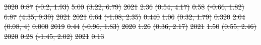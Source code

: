 \documentclass[
  letterpaper,
  DIV=11,
  numbers=noendperiod]{scrartcl}
\providecommand{\DIFdel}[1]{{\protect\color{red}\sout{#1}}}                      %
\providecommand{\DIFdelFL}[1]{\DIFdel{#1}} %
\begin{document}
\DIFdelFL{2020 }%
\DIFdelFL{0.87 }%
\DIFdelFL{(-0.2, 1.93) }%
\DIFdelFL{5.00 }%
\DIFdelFL{(3.22, 6.79) }%
\DIFdelFL{2021 }%
\DIFdelFL{2.36 }%
\DIFdelFL{(0.54, 4.17) }%
\DIFdelFL{0.58 }%
\DIFdelFL{(-0.66, 1.82) }%
\DIFdelFL{6.87 }%
\DIFdelFL{(4.35, 9.39) }%
\DIFdelFL{\hspace{1em}2021 }%
\DIFdelFL{2021 }%
\DIFdelFL{0.64 }%
\DIFdelFL{(-1.08, 2.35) }%
\DIFdelFL{0.440 }%
\DIFdelFL{1.06 }%
\DIFdelFL{(0.32, 1.79) }%
\DIFdelFL{0.320 }%
\DIFdelFL{2.04 }%
\DIFdelFL{(0.08, 4) }%
\DIFdelFL{0.000}%
\DIFdelFL{2019 }%
\DIFdelFL{0.44 }%
\DIFdelFL{(-0.96, 1.83) }%
\DIFdelFL{2020 }%
\DIFdelFL{1.26 }%
\DIFdelFL{(0.36, 2.17) }%
\DIFdelFL{2021 }%
\DIFdelFL{1.50 }%
\DIFdelFL{(0.55, 2.46) }%
\DIFdelFL{2020 }%
\DIFdelFL{0.28 }%
\DIFdelFL{(-1.45, 2.02) }%
\DIFdelFL{2021 }%
\DIFdelFL{0.13 }%
\end{document}
